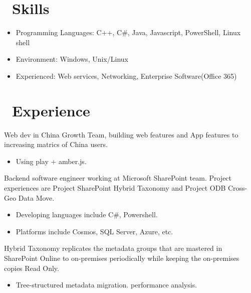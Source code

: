 \documentclass{resume}
\begin{document}



\section{\faCogs\ Skills}
\begin{itemize}[parsep=0.5ex]
  \item Programming Languages: C++, C\#, Java, Javascript, PowerShell, Linux shell
  \item Environment: Windows, Unix/Linux
  \item Experienced: Web services, Networking, Enterprise Software(Office 365)
\end{itemize}

\section{\faUsers\ Experience}
 {}
Web dev in China Growth Team, building web features and App features to increasing matrics of China users.
\begin{itemize}
\item Using play + amber.js.
\end{itemize}

 {}
Backend software engineer working at Microsoft SharePoint team. Project experiences are Project SharePoint Hybrid Taxonomy and Project ODB Cross-Geo Data Move.
\begin{itemize}
\item Developing languages include C\#, Powershell.
\item Platforms include Cosmos, SQL Server, Azure, etc.
\end{itemize}

Hybrid Taxonomy replicates the metadata groups that are mastered in SharePoint Online to on-premises periodically
while keeping the on-premises copies Read Only.
\begin{itemize}
  \item Tree-structured metadata migration. performance analysis.
\end{itemize}
\end{document}
